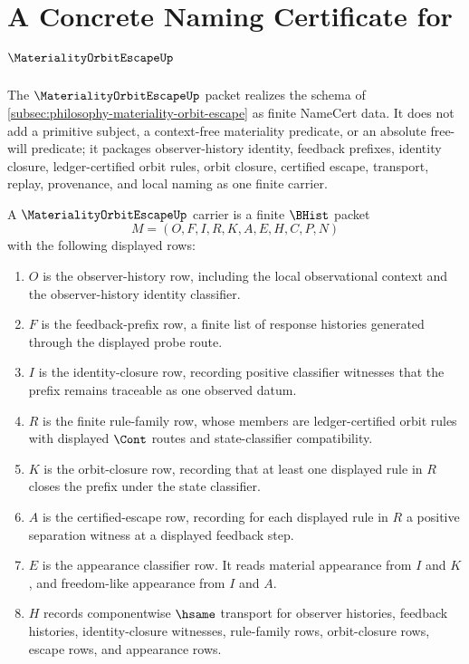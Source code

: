 \chapter{A Concrete Naming Certificate for $\MaterialityOrbitEscapeUp$}
\label{ch:concrete-instances-materiality-orbit-escape-namecert}

The $\MaterialityOrbitEscapeUp$ packet realizes the schema of \autoref{subsec:philosophy-materiality-orbit-escape} as finite NameCert data. It does not add a primitive subject, a context-free materiality predicate, or an absolute free-will predicate; it packages observer-history identity, feedback prefixes, identity closure, ledger-certified orbit rules, orbit closure, certified escape, transport, replay, provenance, and local naming as one finite carrier.

\begin{definition}
\label{def:materiality-orbit-escape-carrier}
A $\MaterialityOrbitEscapeUp$ carrier is a finite $\BHist$ packet
$$
M=(O,F,I,R,K,A,E,H,C,P,N)
$$
with the following displayed rows:
\begin{enumerate}
\item $O$ is the observer-history row, including the local observational context and the observer-history identity classifier.
\item $F$ is the feedback-prefix row, a finite list of response histories generated through the displayed probe route.
\item $I$ is the identity-closure row, recording positive classifier witnesses that the prefix remains traceable as one observed datum.
\item $R$ is the finite rule-family row, whose members are ledger-certified orbit rules with displayed $\Cont$ routes and state-classifier compatibility.
\item $K$ is the orbit-closure row, recording that at least one displayed rule in $R$ closes the prefix under the state classifier.
\item $A$ is the certified-escape row, recording for each displayed rule in $R$ a positive separation witness at a displayed feedback step.
\item $E$ is the appearance classifier row. It reads material appearance from $I$ and $K$, and freedom-like appearance from $I$ and $A$.
\item $H$ records componentwise $\hsame$ transport for observer histories, feedback histories, identity-closure witnesses, rule-family rows, orbit-closure rows, escape rows, and appearance rows.

\end{enumerate}
\end{definition}
